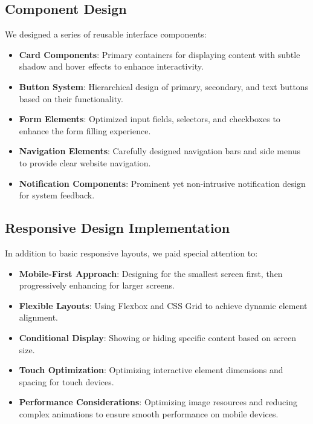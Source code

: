 \subsection{Component Design}
We designed a series of reusable interface components:
\begin{itemize}
    \item \textbf{Card Components}: Primary containers for displaying content with subtle shadow and hover effects to enhance interactivity.
    \item \textbf{Button System}: Hierarchical design of primary, secondary, and text buttons based on their functionality.
    \item \textbf{Form Elements}: Optimized input fields, selectors, and checkboxes to enhance the form filling experience.
    \item \textbf{Navigation Elements}: Carefully designed navigation bars and side menus to provide clear website navigation.
    \item \textbf{Notification Components}: Prominent yet non-intrusive notification design for system feedback.
\end{itemize}

\subsection{Responsive Design Implementation}
In addition to basic responsive layouts, we paid special attention to:
\begin{itemize}
    \item \textbf{Mobile-First Approach}: Designing for the smallest screen first, then progressively enhancing for larger screens.
    \item \textbf{Flexible Layouts}: Using Flexbox and CSS Grid to achieve dynamic element alignment.
    \item \textbf{Conditional Display}: Showing or hiding specific content based on screen size.
    \item \textbf{Touch Optimization}: Optimizing interactive element dimensions and spacing for touch devices.
    \item \textbf{Performance Considerations}: Optimizing image resources and reducing complex animations to ensure smooth performance on mobile devices.
\end{itemize}

